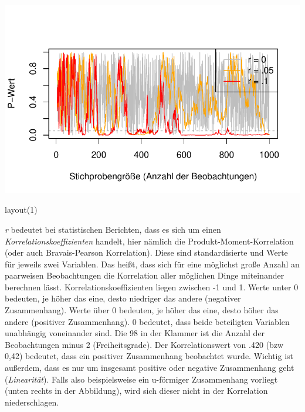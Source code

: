 \documentclass[
  letterpaper,
  DIV=11,
  numbers=noendperiod]{scrreprt}
\newenvironment{Shaded}{\begin{snugshade}}{\end{snugshade}}
\newcommand{\DecValTok}[1]{\textcolor[rgb]{0.68,0.00,0.00}{#1}}
\newcommand{\FunctionTok}[1]{\textcolor[rgb]{0.28,0.35,0.67}{#1}}
\newcommand{\NormalTok}[1]{\textcolor[rgb]{0.00,0.23,0.31}{#1}}
\begin{document}
\includegraphics{probleme_methoden_files/figure-pdf/unnamed-chunk-2-1.pdf}

\begin{Shaded}
\begin{Highlighting}[]
\FunctionTok{layout}\NormalTok{(}\DecValTok{1}\NormalTok{)}
\end{Highlighting}
\end{Shaded}

\begin{tcolorbox}[enhanced jigsaw, title=\textcolor{quarto-callout-note-color}{\faInfo}\hspace{0.5em}{Korrelation}, colbacktitle=quarto-callout-note-color!10!white, rightrule=.15mm, titlerule=0mm, left=2mm, bottomrule=.15mm, arc=.35mm, leftrule=.75mm, toprule=.15mm, opacityback=0, breakable, bottomtitle=1mm, colframe=quarto-callout-note-color-frame, toptitle=1mm, opacitybacktitle=0.6, coltitle=black, colback=white]

\emph{r} bedeutet bei statistischen Berichten, dass es sich um einen
\emph{Korrelationskoeffizienten} handelt, hier nämlich die
Produkt-Moment-Korrelation (oder auch Bravais-Pearson Korrelation).
Diese sind standardisierte und Werte für jeweils zwei Variablen. Das
heißt, dass sich für eine möglichst große Anzahl an paarweisen
Beobachtungen die Korrelation aller möglichen Dinge miteinander
berechnen lässt. Korrelationskoeffizienten liegen zwischen -1 und 1.
Werte unter 0 bedeuten, je höher das eine, desto niedriger das andere
(negativer Zusammenhang). Werte über 0 bedeuten, je höher das eine,
desto höher das andere (positiver Zusammenhang). 0 bedeutet, dass beide
beteiligten Variablen unabhängig voneinander sind. Die 98 in der Klammer
ist die Anzahl der Beobachtungen minus 2 (Freiheitsgrade). Der
Korrelationswert von .420 (bzw 0,42) bedeutet, dass ein positiver
Zusammenhang beobachtet wurde. Wichtig ist außerdem, dass es nur um
insgesamt positive oder negative Zusammenhang geht (\emph{Linearität}).
Falls also beispielsweise ein u-förmiger Zusammenhang vorliegt (unten
rechts in der Abbildung), wird sich dieser nicht in der Korrelation
niederschlagen.

\end{tcolorbox}
\end{document}
